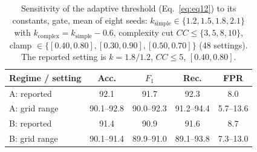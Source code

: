\begin{table}[t]
\centering
\caption{Sensitivity of the adaptive threshold (Eq.~\ref{eq:eq12}) to its constants, gate, mean of eight seeds: $k_{\mathrm{simple}}\in\{1.2,1.5,1.8,2.1\}$ with $k_{\mathrm{complex}}=k_{\mathrm{simple}}-0.6$, complexity cut $CC\le\{3,5,8,10\}$, clamp $\in\{[0.40,0.80],[0.30,0.90],[0.50,0.70]\}$ (48 settings). The reported setting is $k=1.8/1.2$, $CC\le5$, $[0.40,0.80]$.}
\label{tab:sensitivity}
\footnotesize
\setlength{\tabcolsep}{3pt}
\begin{tabular}{lcccc}
\toprule
\textbf{Regime / setting} & Acc. & $F_1$ & Rec. & FPR \\
\midrule
A: reported & 92.1 & 91.7 & 92.3 & 8.0 \\
A: grid range & 90.1--92.8 & 90.0--92.3 & 91.2--94.4 & 5.7--13.6 \\
\midrule
B: reported & 91.4 & 90.9 & 91.6 & 8.7 \\
B: grid range & 90.1--91.4 & 89.9--91.0 & 89.1--93.8 & 7.3--13.0 \\
\bottomrule
\end{tabular}
\end{table}
